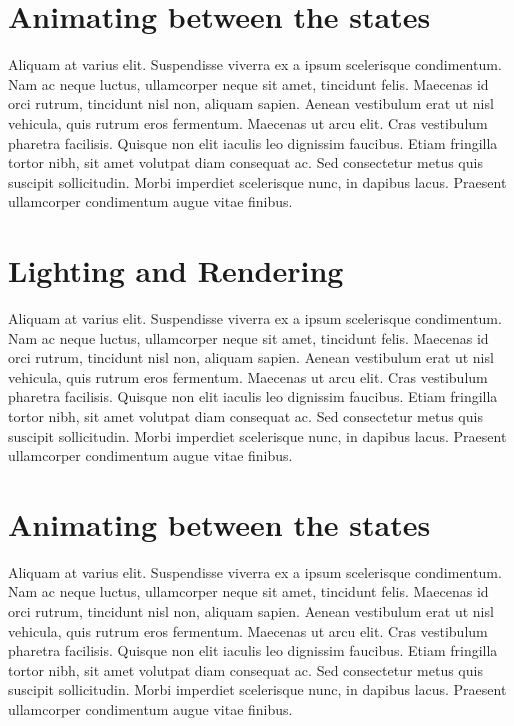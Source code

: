 \section{Animating between the states}

Aliquam at varius elit. Suspendisse viverra ex a ipsum scelerisque condimentum. Nam ac neque luctus, ullamcorper neque sit amet, tincidunt felis. Maecenas id orci rutrum, tincidunt nisl non, aliquam sapien. Aenean vestibulum erat ut nisl vehicula, quis rutrum eros fermentum. Maecenas ut arcu elit. Cras vestibulum pharetra facilisis. Quisque non elit iaculis leo dignissim faucibus. Etiam fringilla tortor nibh, sit amet volutpat diam consequat ac. Sed consectetur metus quis suscipit sollicitudin. Morbi imperdiet scelerisque nunc, in dapibus lacus. Praesent ullamcorper condimentum augue vitae finibus. 

\section{Lighting and Rendering}

Aliquam at varius elit. Suspendisse viverra ex a ipsum scelerisque condimentum. Nam ac neque luctus, ullamcorper neque sit amet, tincidunt felis. Maecenas id orci rutrum, tincidunt nisl non, aliquam sapien. Aenean vestibulum erat ut nisl vehicula, quis rutrum eros fermentum. Maecenas ut arcu elit. Cras vestibulum pharetra facilisis. Quisque non elit iaculis leo dignissim faucibus. Etiam fringilla tortor nibh, sit amet volutpat diam consequat ac. Sed consectetur metus quis suscipit sollicitudin. Morbi imperdiet scelerisque nunc, in dapibus lacus. Praesent ullamcorper condimentum augue vitae finibus. 

\section{Animating between the states}

Aliquam at varius elit. Suspendisse viverra ex a ipsum scelerisque condimentum. Nam ac neque luctus, ullamcorper neque sit amet, tincidunt felis. Maecenas id orci rutrum, tincidunt nisl non, aliquam sapien. Aenean vestibulum erat ut nisl vehicula, quis rutrum eros fermentum. Maecenas ut arcu elit. Cras vestibulum pharetra facilisis. Quisque non elit iaculis leo dignissim faucibus. Etiam fringilla tortor nibh, sit amet volutpat diam consequat ac. Sed consectetur metus quis suscipit sollicitudin. Morbi imperdiet scelerisque nunc, in dapibus lacus. Praesent ullamcorper condimentum augue vitae finibus. 